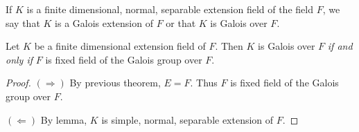 \begin{definition}
    If $K$ is a finite dimensional, normal, separable extension field of the field $F$, we say that 
    $K$ is a Galois extension of $F$ or that $K$ is Galois over $F$.
\end{definition}

\begin{corollary}
    Let $K$ be a finite dimensional extension field of $F$. Then $K$ is Galois over $F$ \textit{if and only if}
    $F$ is fixed field of the Galois group over $F$.
\end{corollary}
\begin{proof}
    $(\Rightarrow)$ By previous theorem, $E = F$. Thus $F$ is fixed field of the Galois group over $F$.

    $(\Leftarrow)$ By lemma, $K$ is simple, normal, separable extension of $F$.
\end{proof}

